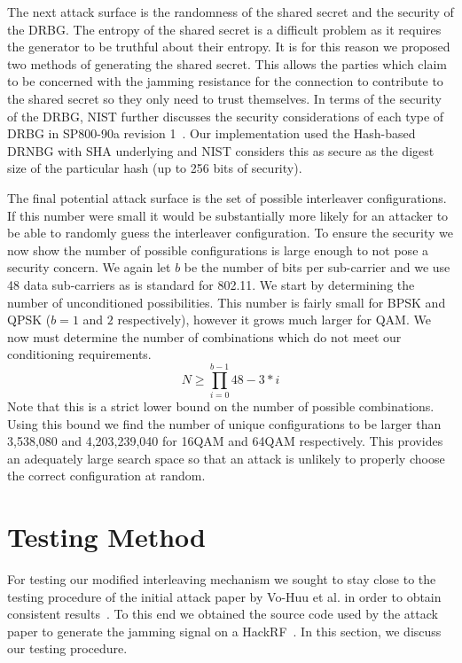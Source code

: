 \documentclass[sigconf]{acmart}
\begin{document}
The next attack surface is the randomness of the shared secret and the security of the DRBG. The entropy of the shared secret is a difficult problem as it requires the generator to be truthful about their entropy. It is for this reason we proposed two methods of generating the shared secret. This allows the parties which claim to be concerned with the jamming resistance for the connection to contribute to the shared secret so they only need to trust themselves. In terms of the security of the DRBG, NIST further discusses the security considerations of each type of DRBG in SP800-90a revision 1~\cite{barker2015nist90a}. Our implementation used the Hash-based DRNBG with SHA underlying and NIST considers this as secure as the digest size of the particular hash (up to 256 bits of security). 

The final potential attack surface is the set of possible interleaver configurations. If this number were small it would be substantially more likely for an attacker to be able to randomly guess the interleaver configuration. To ensure the security we now show the number of possible configurations is large enough to not pose a security concern. We again let $b$ be the number of bits per sub-carrier and we use 48 data sub-carriers as is standard for 802.11. We start by determining the number of unconditioned possibilities. This number is fairly small for BPSK and QPSK ($b= 1$ and $2$ respectively), however it grows much larger for QAM. We now must determine the number of combinations which do not meet our conditioning requirements.
$$N \geq \prod_{i=0}^{b-1} 48 - 3*i$$
Note that this is a strict lower bound on the number of possible combinations. Using this bound we find the number of unique configurations to be larger than 3,538,080 and 4,203,239,040 for 16QAM and 64QAM respectively.  This provides an adequately large search space so that an attack is unlikely to properly choose the correct configuration at random.

\section{Testing Method}
\label{sec:testing}

For testing our modified interleaving mechanism we sought to stay close to the testing procedure of the initial attack paper by Vo-Huu et al. in order to obtain consistent results~\cite{vo2016interleaving}. To this end we obtained the source code used by the attack paper to generate the jamming signal on a HackRF~\cite{vo2016software}. In this section, we discuss our testing procedure.
\end{document}
